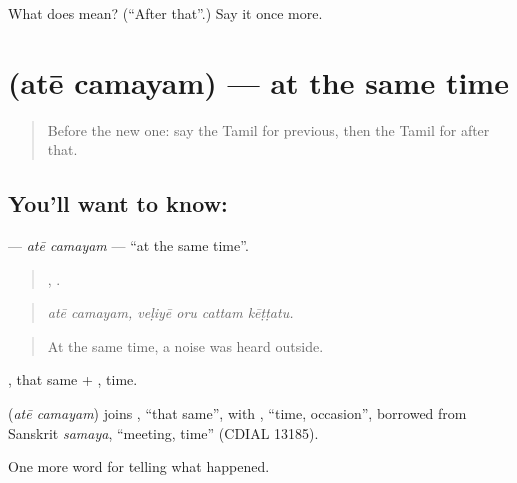 \begin{tcolorbox}[breakable,colback=teal!4,colframe=teal!35!black,title={Before you move on}]
What does  mean? (\textquotedblleft{}After that\textquotedblright{}.) Say it once more.
\end{tcolorbox}
\section[\texorpdfstring{\ta{அதே} \ta{சமயம்} (atē camayam)}{அதே சமயம் (atē camayam)}]{  (atē camayam) — at the same time}

\label{lesson:TA-C316-ate-camayam}



\begin{quote}
Before the new one: say the Tamil for previous, then the Tamil for after that.
\end{quote}

\subsection*{You'll want to know:  }
\textbf{ } — \emph{atē camayam} — \textquotedblleft{}at the same time\textquotedblright{}.

\begin{quote}
 ,    .
\end{quote}

\begin{quote}
\emph{atē camayam, veḷiyē oru cattam kēṭṭatu.}
\end{quote}

\begin{quote}
At the same time, a noise was heard outside.
\end{quote}

, that same + , time.

\begin{cousinweb}
\textbf{ } (\emph{atē camayam}) joins , \textquotedblleft{}that same\textquotedblright{}, with , \textquotedblleft{}time, occasion\textquotedblright{}, borrowed from Sanskrit \emph{samaya}, \textquotedblleft{}meeting, time\textquotedblright{} (CDIAL 13185).
\end{cousinweb}

\begin{grammarlens}[title={What you've built}]
One more word for telling what happened.
\end{grammarlens}

